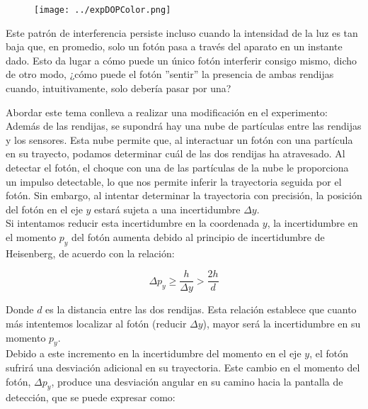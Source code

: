 \documentclass[a4paper]{article}
\begin{document}
    \begin{figure}[h!]
        \centering
        \texttt{[image: ../expDOPColor.png]}
    \end{figure}

    \indent Este patrón de interferencia persiste incluso cuando la intensidad de la luz es tan baja que, en promedio, solo un fotón pasa a través del aparato en un instante dado. Esto da lugar a cómo puede un único fotón interferir consigo mismo, dicho de otro modo, ¿cómo puede el fotón ''sentir'' la presencia de ambas rendijas cuando, intuitivamente, solo debería pasar por una? \\

    \newpage
    \noindent
    \thispagestyle{fancy}

    \indent Abordar este tema conlleva a realizar una modificación en el experimento: Además de las rendijas, se supondrá hay una nube de partículas entre las rendijas y los sensores. Esta nube permite que, al interactuar un fotón con una partícula en su trayecto, podamos determinar cuál de las dos rendijas ha atravesado. Al detectar el fotón, el choque con una de las partículas de la nube le proporciona un impulso detectable, lo que nos permite inferir la trayectoria seguida por el fotón. Sin embargo, al intentar determinar la trayectoria con precisión, la posición del fotón en el eje $y$ estará sujeta a una incertidumbre $\Delta y$.\\

    \indent Si intentamos reducir esta incertidumbre en la coordenada $y$, la incertidumbre en el momento $p_y$ del fotón aumenta debido al principio de incertidumbre de Heisenberg, de acuerdo con la relación:

    \begin{equation}
        \Delta p_y \geq \frac{h}{\Delta y} > \frac{2h}{d} \tag*{}
    \end{equation}

    \indent Donde $d$ es la distancia entre las dos rendijas. Esta relación establece que cuanto más intentemos localizar al fotón (reducir $\Delta y$), mayor será la incertidumbre en su momento $p_y$. \\

    \indent Debido a este incremento en la incertidumbre del momento en el eje $y$, el fotón sufrirá una desviación adicional en su trayectoria. Este cambio en el momento del fotón, $\Delta p_y$, produce una desviación angular en su camino hacia la pantalla de detección, que se puede expresar como:
\end{document}

